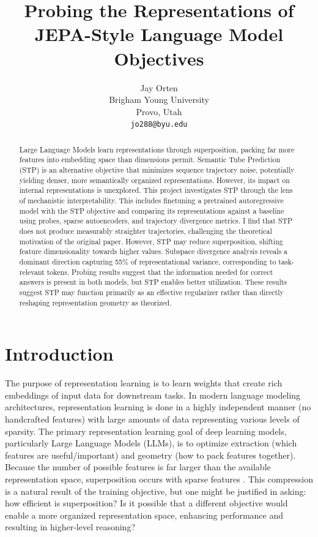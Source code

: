 \documentclass[11pt]{article}
\title{Probing the Representations of JEPA-Style Language Model Objectives}
\author{Jay Orten \\
  Brigham Young University \\
  Provo, Utah \\
  \texttt{jo288@byu.edu} \\
  }
\begin{document}
\maketitle
\renewcommand{\thefootnote}{}
\renewcommand{\thefootnote}{\arabic{footnote}}
\begin{abstract}
  Large Language Models learn representations through superposition, packing far more features into embedding space than dimensions permit. Semantic Tube Prediction (STP) is an alternative objective that minimizes sequence trajectory noise, potentially yielding denser, more semantically organized representations. However, its impact on internal representations is unexplored. This project investigates STP through the lens of mechanistic interpretability. This includes finetuning a pretrained autoregressive model with the STP objective and comparing its representations against a baseline using probes, sparse autoencoders, and trajectory divergence metrics. I find that STP does not produce measurably straighter trajectories, challenging the theoretical motivation of the original paper. However, STP may reduce superposition, shifting feature dimensionality towards higher values. Subspace divergence analysis reveals a dominant direction capturing 55\% of representational variance, corresponding to task-relevant tokens. Probing results suggest that the information needed for correct answers is present in both models, but STP enables better utilization. These results suggest STP may function primarily as an effective regularizer rather than directly reshaping representation geometry as theorized.
\end{abstract}

\section{Introduction}

The purpose of representation learning is to learn weights that create rich embeddings of input data for downstream tasks. In modern language modeling architectures, representation learning is done in a highly independent manner (no handcrafted features) with large amounts of data representing various levels of sparsity. The primary representation learning goal of deep learning models, particularly Large Language Models (LLMs), is to optimize extraction (which features are useful/important) and geometry (how to pack features together). Because the number of possible features is far larger than the available representation space, superposition occurs with sparse features \cite{elhage2022superposition}. This compression is a natural result of the training objective, but one might be justified in asking: how efficient is superposition? Is it possible that a different objective would enable a more organized representation space, enhancing performance and resulting in higher-level reasoning?
\end{document}
